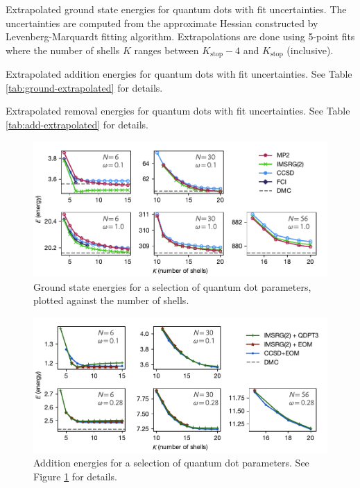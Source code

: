 \begin{table}
  \centering
  \caption{Extrapolated ground state energies for quantum dots with fit uncertainties.  The uncertainties are computed from the approximate Hessian constructed by Levenberg-Marquardt fitting algorithm.  Extrapolations are done using 5-point fits where the number of shells $K$ ranges between $K_{\text{stop}} - 4$ and $K_{\text{stop}}$ (inclusive).}
  \label{tab:ground-extrapolated}
  
\end{table}

\begin{table}
  \centering
  \caption{Extrapolated addition energies for quantum dots with fit uncertainties.  See Table \ref{tab:ground-extrapolated} for details.}
  \label{tab:add-extrapolated}
  
\end{table}

\begin{table}
  \centering
  \caption{Extrapolated removal energies for quantum dots with fit uncertainties.  See Table \ref{tab:add-extrapolated} for details.}
  \label{tab:rm-extrapolated}
  
\end{table}

\begin{figure}
  \centering
  \includegraphics{fig-gs2}
  \caption{Ground state energies for a selection of quantum dot parameters, plotted against the number of shells.}
  \label{fig:gs}
\end{figure}

\begin{figure}
  \centering
  \includegraphics{fig-add2}
  \caption{Addition energies for a selection of quantum dot parameters.  See Figure \ref{fig:gs} for details.}
  \label{fig:add}
\end{figure}

